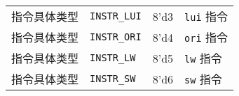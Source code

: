 \begin{longtable}[]{@{}llll@{}}
\begin{minipage}[t]{0.22\columnwidth}
指令具体类型\strut
\end{minipage} & \begin{minipage}[t]{0.22\columnwidth}\raggedright
\texttt{INSTR\_LUI}\strut
\end{minipage} & \begin{minipage}[t]{0.22\columnwidth}\raggedright
8'd3\strut
\end{minipage} & \begin{minipage}[t]{0.22\columnwidth}\raggedright
\texttt{lui} 指令\strut
\end{minipage}\tabularnewline
\begin{minipage}[t]{0.22\columnwidth}\raggedright
指令具体类型\strut
\end{minipage} & \begin{minipage}[t]{0.22\columnwidth}\raggedright
\texttt{INSTR\_ORI}\strut
\end{minipage} & \begin{minipage}[t]{0.22\columnwidth}\raggedright
8'd4\strut
\end{minipage} & \begin{minipage}[t]{0.22\columnwidth}\raggedright
\texttt{ori} 指令\strut
\end{minipage}\tabularnewline
\begin{minipage}[t]{0.22\columnwidth}\raggedright
指令具体类型\strut
\end{minipage} & \begin{minipage}[t]{0.22\columnwidth}\raggedright
\texttt{INSTR\_LW}\strut
\end{minipage} & \begin{minipage}[t]{0.22\columnwidth}\raggedright
8'd5\strut
\end{minipage} & \begin{minipage}[t]{0.22\columnwidth}\raggedright
\texttt{lw} 指令\strut
\end{minipage}\tabularnewline
\begin{minipage}[t]{0.22\columnwidth}\raggedright
指令具体类型\strut
\end{minipage} & \begin{minipage}[t]{0.22\columnwidth}\raggedright
\texttt{INSTR\_SW}\strut
\end{minipage} & \begin{minipage}[t]{0.22\columnwidth}\raggedright
8'd6\strut
\end{minipage} & \begin{minipage}[t]{0.22\columnwidth}\raggedright
\texttt{sw} 指令\strut
\end{minipage}\tabularnewline

\end{longtable}
